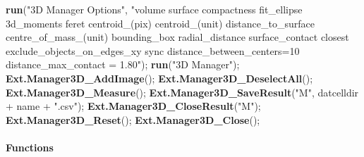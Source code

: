 \documentclass[11pt,singlespacinge,twoside]{reedthesis} %
\newenvironment{Shaded}{}{}
\newcommand{\KeywordTok}[1]{\textbf{#1}}
\newcommand{\NormalTok}[1]{#1}
\newcommand{\OperatorTok}[1]{#1}
\newcommand{\StringTok}[1]{#1}
\theoremstyle{definition}
\theoremstyle{definition}
\theoremstyle{definition}
\theoremstyle{remark}
\begin{document}
\scriptsize
\begin{Shaded}
\begin{Highlighting}[numbers=left,,]
\KeywordTok{run}\NormalTok{(}\StringTok{"3D Manager Options"}\NormalTok{, }\StringTok{"volume surface compactness fit_ellipse 3d_moments }
\StringTok{    feret centroid_(pix) centroid_(unit) distance_to_surface centre_of_mass_(unit) }
\StringTok{    bounding_box radial_distance surface_contact closest exclude_objects_on_edges_xy }
\StringTok{    sync distance_between_centers=10 distance_max_contact = 1.80"}\NormalTok{);}
\KeywordTok{run}\NormalTok{(}\StringTok{"3D Manager"}\NormalTok{);}
\KeywordTok{Ext.Manager3D_AddImage}\NormalTok{();}
\KeywordTok{Ext.Manager3D_DeselectAll}\NormalTok{();}
\KeywordTok{Ext.Manager3D_Measure}\NormalTok{();}
\KeywordTok{Ext.Manager3D_SaveResult}\NormalTok{(}\StringTok{"M"}\NormalTok{, datcelldir }\OperatorTok{+}\StringTok{ }\NormalTok{name }\OperatorTok{+}\StringTok{ ".csv"}\NormalTok{);}
\KeywordTok{Ext.Manager3D_CloseResult}\NormalTok{(}\StringTok{"M"}\NormalTok{);}
\KeywordTok{Ext.Manager3D_Reset}\NormalTok{();}
\KeywordTok{Ext.Manager3D_Close}\NormalTok{();}
\end{Highlighting}
\end{Shaded}
\normalsize

\hypertarget{functions}{%
\paragraph{Functions}\label{functions}}
\end{document}
